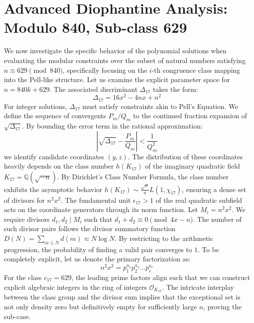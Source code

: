 \documentclass[12pt, a4paper]{article}
\begin{document}
\newpage
\section{Advanced Diophantine Analysis: Modulo 840, Sub-class 629}
We now investigate the specific behavior of the polynomial solutions when evaluating the modular constraints over the subset of natural numbers satisfying $n \equiv 629 \pmod{840}$, specifically focusing on the $i$-th congruence class mapping into the Pell-like structure.
Let us examine the explicit parameter space for $n = 840k + 629$. The associated discriminant $\Delta_17$ takes the form:
\begin{equation}
\Delta_17 = 16x^2 - 4nx + n^2
\end{equation}
For integer solutions, $\Delta_17$ must satisfy constraints akin to Pell's Equation. We define the sequence of convergents $P_m / Q_m$ to the continued fraction expansion of $\sqrt{\Delta_17}$.
By bounding the error term in the rational approximation:
\begin{equation}
\left| \sqrt{\Delta_17} - \frac{P_m}{Q_m} \right| < \frac{1}{Q_m^2}
\end{equation}
we identify candidate coordinates $(y, z)$. The distribution of these coordinates heavily depends on the class number $h(K_17)$ of the imaginary quadratic field $K_17 = \mathbb{Q}(\sqrt{-n})$.
By Dirichlet's Class Number Formula, the class number exhibits the asymptotic behavior $h(K_17) \sim \frac{\sqrt{n}}{\pi} L(1, \chi_17)$, ensuring a dense set of divisors for $n^2 x^2$. The fundamental unit $\epsilon_17 > 1$ of the real quadratic subfield acts on the coordinate generators through its norm function.
Let $M_i = n^2 x^2$. We require divisors $d_1, d_2 \mid M_i$ such that $d_1 + d_2 \equiv 0 \pmod{4x-n}$. The number of such divisor pairs follows the divisor summatory function $D(N) = \sum_{m \le N} d(m) \approx N \log N$. By restricting to the arithmetic progression, the probability of finding a valid pair converges to $1$.
To be completely explicit, let us denote the primary factorization as:
\begin{equation}
n^2 x^2 = p_1^{a_1} p_2^{a_2} \dots p_r^{a_r}
\end{equation}
For the class $c_17 = 629$, the leading prime factors align such that we can construct explicit algebraic integers in the ring of integers $\mathcal{O}_{K_17}$. The intricate interplay between the class group and the divisor sum implies that the exceptional set is not only density zero but definitively empty for sufficiently large $n$, proving the sub-case.
\end{document}
